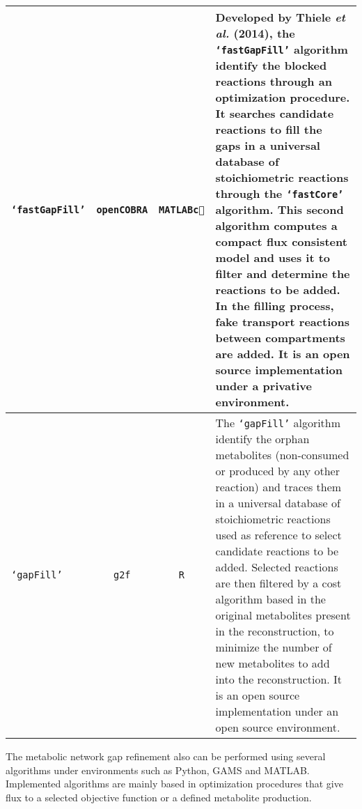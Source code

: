 \begin{center}
\begin{longtable}{|m{3.6cm}|c|c|m{6.8cm}|}
\hline
\texttt{`fastGapFill'} \cite{Thiele2014gf}&\texttt{openCOBRA}&\texttt{MATLAB\textcircled{c}} & {\small Developed by Thiele \textit{et al.} (2014), the \texttt{`fastGapFill'} algorithm identify the blocked reactions through an optimization procedure. It searches candidate reactions to fill the gaps in a universal database of stoichiometric reactions through the \texttt{`fastCore'} algorithm. This second algorithm computes a compact flux consistent model and uses it to filter and determine the reactions to be added. In the filling process, fake transport reactions between compartments are added. It is an open source implementation under a privative environment.}\\
\hline
\texttt{`gapFill'}\cite{G2F}&\texttt{g2f}&\texttt{R} & {\small The \texttt{`gapFill'} algorithm identify the orphan metabolites (non-consumed or produced by any other reaction) and traces them in a universal database of stoichiometric reactions used as reference to select candidate reactions to be added. Selected reactions are then filtered by a cost algorithm based in the original metabolites present in the reconstruction, to minimize the number of new metabolites to add into the reconstruction. It is an open source implementation under an open source environment.}\\
\hline
\end{longtable}
\end{center}

The metabolic network gap refinement also can be performed using several algorithms under environments such as Python, GAMS and MATLAB. Implemented algorithms are mainly based in optimization procedures that give flux to a selected objective function or a defined metabolite production.\\
 
